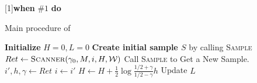 
[1]{\textbf{when} \(\mbox{#1}\) \textbf{do}}{}%

\begin{algorithm}[H]
\caption{Main procedure of \Sparrow}\label{algorithm}

\begin{algorithmic}[0]

\State \textbf{Initialize} $H=0, L=0$
\State \textbf{Create initial sample $S$} by calling \textsc{Sample}
  \State $Ret \gets \Call{Scanner}{\gamma_0, M, i, H, \weakRules}$
  \State Call \textsc{Sample} to Get a New Sample.
  \Else
  \State $i',h,\gamma \gets Ret$
  \State $i \gets i'$
  \State $H \gets H + \frac{1}{2} \log \frac{1/2+\gamma}{1/2-\gamma} h$
  \State Update $L$
  \EndIf
\EndFor

\end{algorithmic}

\end{algorithm}



